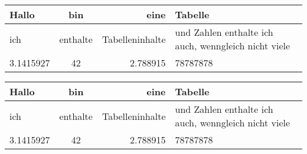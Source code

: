 \documentclass[ngerman,10pt,parskip=half]{scrartcl}
\begin{document}
\listoftables

\clearpage

\begin{tabular}{|l|c|r|p{5cm}|} \hline
Hallo & bin & eine  & Tabelle \\	\hline
ich 	& enthalte & Tabelleninhalte & und Zahlen enthalte ich auch, wenngleich nicht viele  \\ \hline
3.1415927 & 42 & 2.788915 & 78787878 \\ \hline
\end{tabular}

\vspace*{3cm}

\begin{tabular}{lcrp{5cm}} \toprule[1.5pt]
	Hallo & bin & eine  & Tabelle \\	\midrule
	ich 	& enthalte & Tabelleninhalte & und Zahlen enthalte ich auch, wenngleich nicht viele  \\ \hline
	3.1415927 & 42 & 2.788915 & 78787878 \\ \bottomrule[1.5pt]
\end{tabular}

\vspace*{3cm}
\end{document}
